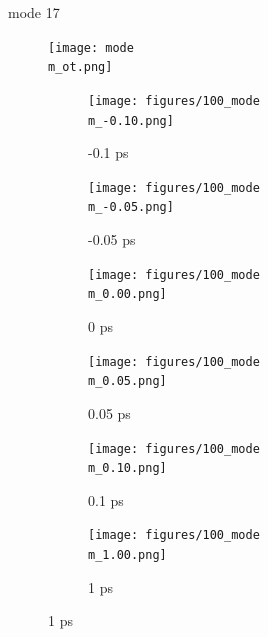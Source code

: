\documentclass{beamer}
\newcommand\w{0.32}
\begin{document}
\renewcommand\m{17}
\begin{frame}{mode \m}
				\vspace{\vh mm}
	\begin{figure}
		\centering
		\texttt{[image: mode\\m\_ot.png]}
	\end{figure}
	\begin{figure}
		\centering
		\begin{subfigure}[b]{\w\textwidth}
			\centering
			\texttt{[image: figures/100\_mode\\m\_-0.10.png]}
			\caption{-0.1 ps}
		\end{subfigure}
		\begin{subfigure}[b]{\w\textwidth}
			\centering
			\texttt{[image: figures/100\_mode\\m\_-0.05.png]}
			\caption{-0.05 ps}
		\end{subfigure}
		\begin{subfigure}[b]{\w\textwidth}
			\centering
			\texttt{[image: figures/100\_mode\\m\_0.00.png]}
			\caption{0 ps}
		\end{subfigure}
		\begin{subfigure}[b]{\w\textwidth}
			\centering
			\texttt{[image: figures/100\_mode\\m\_0.05.png]}
			\caption{0.05 ps}
		\end{subfigure}
		\begin{subfigure}[b]{\w\textwidth}
			\centering
			\texttt{[image: figures/100\_mode\\m\_0.10.png]}
			\caption{0.1 ps}
		\end{subfigure}
		\begin{subfigure}[b]{\w\textwidth}
			\centering
			\texttt{[image: figures/100\_mode\\m\_1.00.png]}
			\caption{1 ps}
		\end{subfigure}
	\end{figure}
\end{frame}
\end{document}

